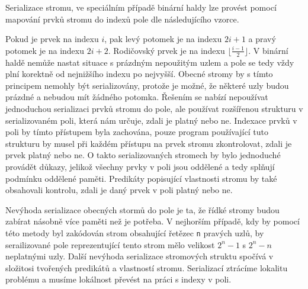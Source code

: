 Serializace stromu, ve speciálním případě binární haldy
lze provést pomocí mapování prvků stromu do indexů pole dle následujícího vzorce.

Pokud je prvek na indexu $i$, pak levý potomek je na indexu $2i + 1$ a pravý potomek je na indexu $2i + 2$.
Rodičovský prvek je na indexu $\lfloor \frac{i - 1}{2} \rfloor$.
V binární haldě nemůže nastat situace s prázdným nepoužitým uzlem a pole se tedy vždy plní korektně
od nejnižšího indexu po nejvyšší.
Obecné stromy by s tímto principem nemohly být serializovány,
protože je možné, že některé uzly budou prázdné a nebudou mít žádného potomka.
Řešením se nabízí nepoužívat jednoduchou serializaci prvků stromu do pole,
ale používat rozšířenou strukturu v serializovaném poli, která nám určuje, zdali je
platný nebo ne.
Indexace prvků v poli by tímto přístupem byla zachována,
pouze program používající tuto strukturu by musel při každém přístupu na prvek stromu
zkontrolovat, zdali je prvek platný nebo ne.
O takto serializovaných stromech by bylo jednoduché provádět důkazy,
jelikož všechny prvky v poli jsou oddělené a tedy splňují podmínku oddělené paměti.
Predikáty popisující vlastnosti stromu by také obsahovali kontrolu, zdali je daný prvek v poli platný nebo ne.

Nevýhoda serializace obecných stormů do pole je ta, že řídké stromy budou zabírat
násobně více paměti než je potřeba.
V nejhorším případě, kdy by pomocí této metody byl zakódován strom obsahující řetězec \texttt{n} pravých uzlů,
by serailizované pole reprezentující tento strom mělo velikost $2^n - 1$ s $2^n - n$ neplatnými uzly.
Další nevýhoda serializace stromových struktu spočívá v složitosi
tvořených predikátů a vlastností stromu.
Serializací ztrácíme lokalitu problému a musíme lokálnost převést na práci s indexy v poli.











